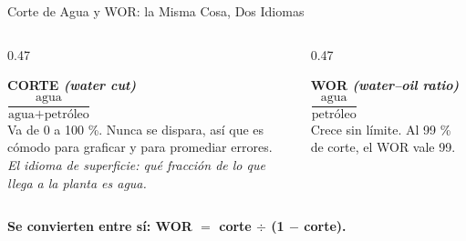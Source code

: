 \documentclass[aspectratio=169, 11pt]{beamer}
\begin{document}
\begin{frame}[shrink=20]{Corte de Agua y WOR: la Misma Cosa, Dos Idiomas}
  \vspace{2pt}
  \begin{columns}[T]
    \begin{column}{0.47\textwidth}
      \begin{tcolorbox}[colback=arcaGray, colframe=arcaDark, boxrule=0pt,
        leftrule=3pt, arc=3pt, left=8pt, right=8pt, top=4pt, bottom=4pt]
        {\scriptsize\color{arcaDark}\bfseries CORTE \emph{(water cut)}}\\[5pt]
        {\footnotesize\color{textMuted}
         $\dfrac{\text{agua}}{\text{agua} + \text{petróleo}}$\\[7pt]
         Va de 0 a 100 \%. Nunca se dispara, así que es cómodo para graficar y
         para promediar errores.}\\[5pt]
        {\scriptsize\color{textMuted}\itshape
         El idioma de superficie: qué fracción de lo que llega a la planta es
         agua.}
      \end{tcolorbox}
    \end{column}
    \begin{column}{0.47\textwidth}
      \begin{tcolorbox}[colback=arcaGray, colframe=arcaRed, boxrule=0pt,
        leftrule=3pt, arc=3pt, left=8pt, right=8pt, top=4pt, bottom=4pt]
        {\scriptsize\color{arcaRed}\bfseries WOR \emph{(water--oil ratio)}}\\[5pt]
        {\footnotesize\color{textMuted}
         $\dfrac{\text{agua}}{\text{petróleo}}$\\[7pt]
         Crece sin límite. Al 99 \% de corte, el WOR vale 99.}\\[5pt]
      \end{tcolorbox}
    \end{column}
  \end{columns}
  \vspace{3pt}
  {\footnotesize\color{arcaDark}\bfseries
   Se convierten entre sí: \; WOR $=$ corte $\div$ (1 $-$ corte).}
\end{frame}
\end{document}
